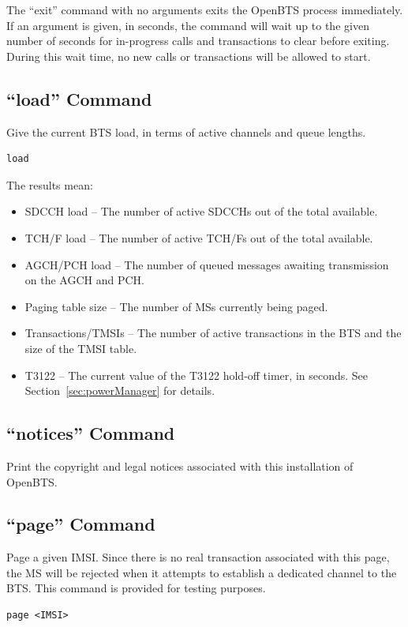 \documentclass[11pt,openany]{book}
\begin{document}
The ``exit'' command with no arguments exits the OpenBTS process immediately.
If an argument is given, in seconds, the command will wait up to the given number of seconds for in-progress calls and transactions to clear before exiting.
During this wait time, no new calls or transactions will be allowed to start.


\subsection{``load'' Command}
Give the current BTS load, in terms of active channels and queue lengths.
\begin{verbatim}
load
\end{verbatim}
The results mean:
\begin{itemize}
	\item SDCCH load -- The number of active SDCCHs out of the total available.
	\item TCH/F load -- The number of active TCH/Fs out of the total available.
	\item AGCH/PCH load -- The number of queued messages awaiting transmission on the AGCH and PCH.
	\item Paging table size -- The number of MSs currently being paged.
	\item Transactions/TMSIs -- The number of active transactions in the BTS and the size of the TMSI table.
	\item T3122 -- The current value of the T3122 hold-off timer, in seconds.  See Section~\ref{sec:powerManager} for details.
\end{itemize}

\subsection{``notices'' Command}
Print the copyright and legal notices associated with this installation of OpenBTS.

\subsection{``page'' Command}
\label{sec:pageCmd}
Page a given IMSI.  Since there is no real transaction associated with this page, the MS will be rejected when it attempts to establish a dedicated channel to the BTS.  This command is provided for testing purposes.
\begin{verbatim}
page <IMSI>
\end{verbatim}
\end{document}
